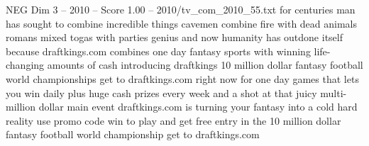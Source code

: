 \begin{textsample}{NEG Dim 3 – 2010 – Score 1.00 – 2010/tv\_com\_2010\_55.txt}  \label{ex:f3_neg_060}
for centuries man has sought to combine incredible things cavemen combine fire with dead animals romans mixed togas with parties genius and now humanity has outdone itself because draftkings.com combines one day fantasy sports with winning life-changing amounts of cash introducing draftkings 10 million dollar fantasy football world championships get to draftkings.com right now for one day games that lets you win daily plus huge cash prizes every week and a shot at that juicy multi-million dollar main event draftkings.com is turning your fantasy into a cold hard reality use promo code win to play and get free entry in the 10 million dollar fantasy football world championship get to draftkings.com

\end{textsample}
